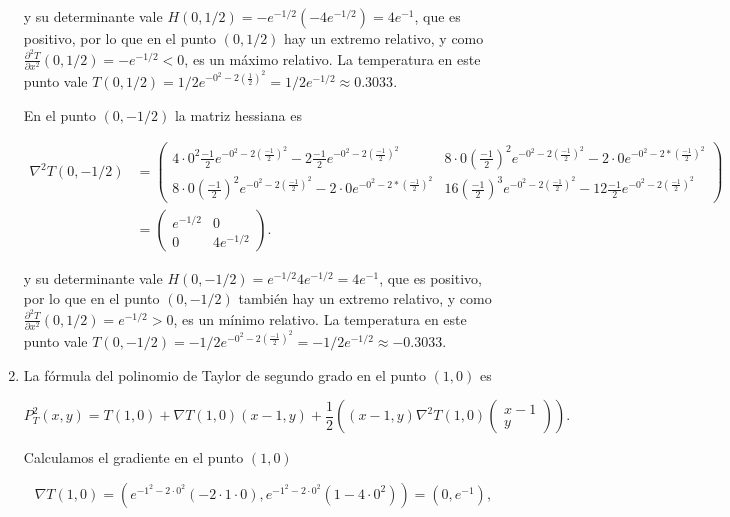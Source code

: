 \documentclass[
  a4paper,
]{scrreport}
\theoremstyle{definition}
\theoremstyle{remark}
\begin{document}
\begin{tcolorbox}
\begin{enumerate}
  y su determinante vale \(H(0,1/2) = -e^{-1/2}(-4e^{-1/2}) = 4e^{-1}\),
  que es positivo, por lo que en el punto \((0,1/2)\) hay un extremo
  relativo, y como
  \(\frac{\partial^2 T}{\partial x^2}(0,1/2) = -e^{-1/2} < 0\), es un
  máximo relativo. La temperatura en este punto vale
  \(T(0,1/2) = 1/2e^{-0^2 - 2\left(\frac{1}{2}\right)^2} = 1/2e^{-1/2} \approx 0.3033\).

  En el punto \((0,-1/2)\) la matriz hessiana es

  \begin{align*}
  \nabla^2T(0,-1/2)
  &= \begin{pmatrix}
  4\cdot 0^2\frac{-1}{2}e^{-0^2 - 2\left(\frac{-1}{2}\right)^2} - 2\frac{-1}{2}e^{-0^2 - 2\left(\frac{-1}{2}\right)^2} & 8\cdot 0\left(\frac{-1}{2}\right)^2e^{-0^2 - 2\left(\frac{-1}{2}\right)^2} - 2\cdot 0e^{-0^2 - 2*\left(\frac{-1}{2}\right)^2} \\
  8\cdot 0\left(\frac{-1}{2}\right)^2e^{-0^2 - 2\left(\frac{-1}{2}\right)^2} - 2\cdot 0e^{-0^2 - 2*\left(\frac{-1}{2}\right)^2} & 16\left(\frac{-1}{2}\right)^3e^{-0^2 - 2\left(\frac{-1}{2}\right)^2} - 12\frac{-1}{2}e^{-0^2 - 2\left(\frac{-1}{2}\right)^2} 
  \end{pmatrix}\\
  &= \begin{pmatrix}
  e^{-1/2} & 0 \\
  0 & 4e^{-1/2}
  \end{pmatrix}.
  \end{align*}

  y su determinante vale \(H(0,-1/2) = e^{-1/2}4e^{-1/2} = 4e^{-1}\),
  que es positivo, por lo que en el punto \((0,-1/2)\) también hay un
  extremo relativo, y como
  \(\frac{\partial^2 T}{\partial x^2}(0,1/2) = e^{-1/2} > 0\), es un
  mínimo relativo. La temperatura en este punto vale
  \(T(0,-1/2) = -1/2e^{-0^2 - 2\left(\frac{-1}{2}\right)^2} = -1/2e^{-1/2} \approx -0.3033\).
\item
  La fórmula del polinomio de Taylor de segundo grado en el punto
  \((1,0)\) es

  \[
  P_T^2(x,y) = T(1,0) + \nabla T(1,0) (x-1, y) + \frac{1}{2} \left((x-1,y)\nabla^2T(1,0)\begin{pmatrix}x-1 \\ y\end{pmatrix}\right).
  \]

  Calculamos el gradiente en el punto \((1,0)\)

  \[
  \nabla T(1,0) = \left(e^{-1^2-2\cdot 0^2}(-2\cdot 1\cdot 0), e^{-1^2-2\cdot 0^2}(1-4\cdot 0^2)\right) = (0,e^{-1}),
  \]


\end{enumerate}
\end{tcolorbox}
\end{document}
